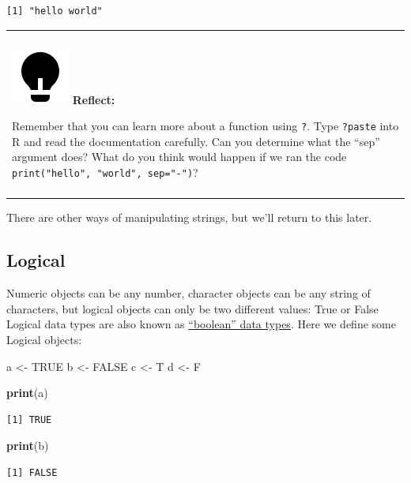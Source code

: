 \documentclass[
]{book}
\newenvironment{Shaded}{\begin{snugshade}}{\end{snugshade}}
\newcommand{\KeywordTok}[1]{\textcolor[rgb]{0.13,0.29,0.53}{\textbf{#1}}}
\newcommand{\NormalTok}[1]{#1}
\newcommand{\OtherTok}[1]{\textcolor[rgb]{0.56,0.35,0.01}{#1}}
\newcommand{\StringTok}[1]{\textcolor[rgb]{0.31,0.60,0.02}{#1}}
\newenvironment{reflect}
{
  \begin{center}
  \begin{tabular}{|>{\columncolor{reflect}}p{0.9\textwidth}|}
  \hline\\
  \includegraphics[scale=0.1]{src/images/lightbulb-fill.png}
  \textbf{Reflect:}
}
{\\\\\hline
  \end{tabular}
  \end{center}
}
\begin{document}
\begin{verbatim}
[1] "hello world"
\end{verbatim}

\begin{reflect}
Remember that you can learn more about a function using \texttt{?}. Type
\texttt{?paste} into R and read the documentation carefully. Can you
determine what the ``sep'' argument does? What do you think would happen
if we ran the code \texttt{print("hello",\ "world",\ sep="-")}?
\end{reflect}

There are other ways of manipulating strings, but we'll return to this later.

\hypertarget{logical}{%
\subsection{Logical}\label{logical}}

Numeric objects can be any number, character objects can be any string of characters, but logical objects can only be two different values: True or False
Logical data types are also known as \href{https://en.wikipedia.org/wiki/Boolean_data_type}{``boolean'' data types}.
Here we define some Logical objects:

\begin{Shaded}
\begin{Highlighting}[]
\NormalTok{a <-}\StringTok{ }\OtherTok{TRUE}
\NormalTok{b <-}\StringTok{ }\OtherTok{FALSE}
\NormalTok{c <-}\StringTok{ }\NormalTok{T}
\NormalTok{d <-}\StringTok{ }\NormalTok{F}
\end{Highlighting}
\end{Shaded}

\begin{Shaded}
\begin{Highlighting}[]
\KeywordTok{print}\NormalTok{(a)}
\end{Highlighting}
\end{Shaded}

\begin{verbatim}
[1] TRUE
\end{verbatim}

\begin{Shaded}
\begin{Highlighting}[]
\KeywordTok{print}\NormalTok{(b)}
\end{Highlighting}
\end{Shaded}

\begin{verbatim}
[1] FALSE
\end{verbatim}
\end{document}
